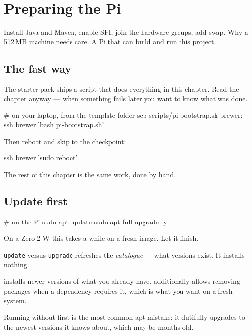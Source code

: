 \chapter{Preparing the Pi}
\label{ch:pisetup}

\chapterbrief
  {Install Java and Maven, enable SPI, join the hardware groups, add swap.}
  {Why a 512\,MB machine needs care.}
  {A Pi that can build and run this project.}

\section{The fast way}

The starter pack ships a script that does everything in this chapter. Read the
chapter anyway --- when something fails later you want to know what was done.

\begin{shell}
# on your laptop, from the template folder
scp scripts/pi-bootstrap.sh brewer:~
ssh brewer 'bash pi-bootstrap.sh'
\end{shell}

Then reboot and skip to the checkpoint:

\begin{shell}
ssh brewer 'sudo reboot'
\end{shell}

The rest of this chapter is the same work, done by hand.

\section{Update first}

\begin{shell}
# on the Pi
sudo apt update
sudo apt full-upgrade -y
\end{shell}

On a Zero 2 W this takes a while on a fresh image. Let it finish.

\begin{concept}{\texttt{update} versus \texttt{upgrade}}
 refreshes the \emph{catalogue} --- what versions exist. It
installs nothing.

 installs newer versions of what you already have.
 additionally allows removing packages when a dependency
requires it, which is what you want on a fresh system.

Running  without  first is the most common apt
mistake: it dutifully upgrades to the newest versions it knows about, which may
be months old.
\end{concept}

